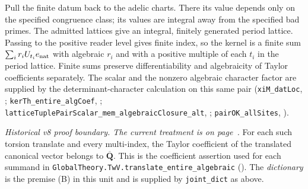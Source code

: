 Pull the finite datum back to the adelic charts. There its value depends only on the specified congruence class; its values are integral away from the specified bad primes. The admitted lattices give an integral, finitely generated period lattice. Passing to the positive reader level gives finite index, so the kernel is a finite sum \(\sum_i r_i U_{t_i}e_{\rm nat}\) with algebraic \(r_i\) and with a positive multiple of each \(t_i\) in the period lattice. Finite sums preserve differentiability and algebraicity of Taylor coefficients separately. The scalar and the nonzero algebraic character factor are supplied by the determinant-character calculation on this same pair (\nolinkurl{xiM_datLoc}, ; \nolinkurl{kerTh_entire_algCoef}, ; \nolinkurl{latticeTuplePairScalar_mem_algebraicClosure_alt}, ; \nolinkurl{pairOK_allSites}, ).

\emph{Historical v8 proof boundary. The current treatment is on page~\pageref{r8:Z4.2.04}.} For each such torsion translate and every multi-index, the Taylor coefficient of the translated canonical vector belongs to \(\overline{\mathbf Q}\). This is the coefficient assertion used for each summand in \nolinkurl{GlobalTheory.TwV.translate_entire_algebraic} (). The \emph{dictionary} is the premise (B) in this unit and is supplied by \nolinkurl{joint_dict} as above.

